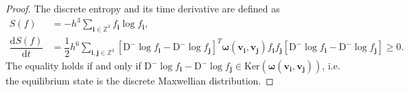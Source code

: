\documentclass[10pt,a4paper]{amsart}
\begin{document}
\begin{proof}
The discrete entropy and its time derivative are defined as
\begin{equation}
    \begin{aligned}
        S(f) &= - h^{3} \sum_{\boldsymbol{i}\in\mathbb{Z}^{3}} f_{\boldsymbol{i}} \log f_{\boldsymbol{i}} , \\
        \dfrac{\mathrm{d} S(f)}{\mathrm{d} t} &= \dfrac{1}{2} h^{6} \sum_{\boldsymbol{i},\boldsymbol{j}\in\mathbb{Z}^{3}} \left[ \mathrm{D}^{-} \log f_{\boldsymbol{i}} - \mathrm{D}^{-} \log f_{\boldsymbol{j}} \right]^{T} \boldsymbol{\omega}(\boldsymbol{v}_{\boldsymbol{i}},\boldsymbol{v}_{\boldsymbol{j}}) f_{\boldsymbol{i}} f_{\boldsymbol{j}} \left[ \mathrm{D}^{-} \log f_{\boldsymbol{i}} - \mathrm{D}^{-} \log f_{\boldsymbol{j}} \right] \geq 0.
    \end{aligned}
\end{equation}
%
The equality holds if and only if $\mathrm{D}^{-} \log f_{\boldsymbol{i}} - \mathrm{D}^{-} \log f_{\boldsymbol{j}} \in \text{Ker}(\boldsymbol{\omega}(\boldsymbol{v}_{\boldsymbol{i}},\boldsymbol{v}_{\boldsymbol{j}}))$, i.e. the equilibrium state is the discrete Maxwellian distribution.
\end{proof}
\end{document}
